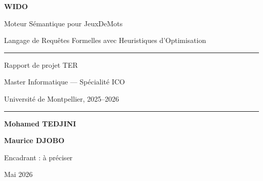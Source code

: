 \documentclass[12pt,a4paper]{report}
\newcommand{\wido}{\textsc{WIDO}}
\newcommand{\jdm}{\textsc{JeuxDeMots}}
\begin{document}
\begin{titlepage}
    \centering
    \vspace*{2cm}
    {\Huge\bfseries WIDO\par}
    {\Large Moteur Sémantique pour JeuxDeMots\par}
    \vspace{0.5cm}
    {\large Langage de Requêtes Formelles avec Heuristiques d'Optimisation\par}
    \vspace{2cm}
    \hrule height 1pt
    \vspace{0.5cm}
    {\large Rapport de projet TER\par}
    {\normalsize Master Informatique — Spécialité ICO\par}
    {\normalsize Université de Montpellier, 2025--2026\par}
    \vspace{0.5cm}
    \hrule height 1pt
    \vspace{2cm}
    {\Large\bfseries Mohamed TEDJINI\par}
    {\Large\bfseries Maurice DJOBO\par}
    \vspace{1.5cm}
    {\normalsize Encadrant : \`a pr\'eciser\par}
    \vfill
    {\normalsize Mai 2026\par}
\end{titlepage}

\begin{abstract}
\wido{} est un moteur de recherche sémantique permettant d'interroger le graphe de connaissances \jdm{} (JDM) via un langage de requêtes formel à variables. L'utilisateur formule des requêtes telles que \texttt{(\$x r\_isa animal) ET (\$x r\_has\_part queue)}, que le moteur parse en arbre de décision, optimise par des heuristiques structurelles et de cardinalité, puis exécute en interrogeant l'API JDM v0. Les résultats sont croisés par jointures ensemblistes basées sur les identifiants des nœuds, classés par score de pertinence, et présentés avec leurs preuves dans une interface web glassmorphique.
\end{abstract}

\tableofcontents
\clearpage
















\end{document}
